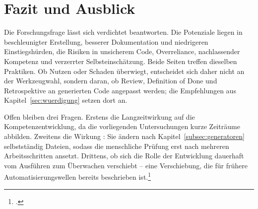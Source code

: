 \section{Fazit und Ausblick}\label{sec:fazit}
Die Forschungsfrage lässt sich verdichtet beantworten. Die Potenziale liegen in beschleunigter Erstellung, besserer Dokumentation und niedrigeren Einstiegshürden, die Risiken in unsicherem Code, Overreliance, nachlassender Kompetenz und verzerrter Selbsteinschätzung. Beide Seiten treffen dieselben Praktiken. Ob Nutzen oder Schaden überwiegt, entscheidet sich daher nicht an der Werkzeugwahl, sondern daran, ob Review, Definition of Done und Retrospektive an generierten Code angepasst werden; die Empfehlungen aus Kapitel~\ref{sec:wuerdigung} setzen dort an.

Offen bleiben drei Fragen. Erstens die Langzeitwirkung auf die Kompetenzentwicklung, da die vorliegenden Untersuchungen kurze Zeiträume abbilden. Zweitens die Wirkung : Sie ändern nach Kapitel~\ref{subsec:generatoren} selbstständig Dateien, sodass die menschliche Prüfung erst nach mehreren Arbeitsschritten ansetzt. Drittens, ob sich die Rolle der Entwicklung dauerhaft vom Ausführen zum Überwachen verschiebt -- eine Verschiebung, die für frühere Automatisierungswellen bereits beschrieben ist.\footcite[\vglf][]{Shen.2026}
